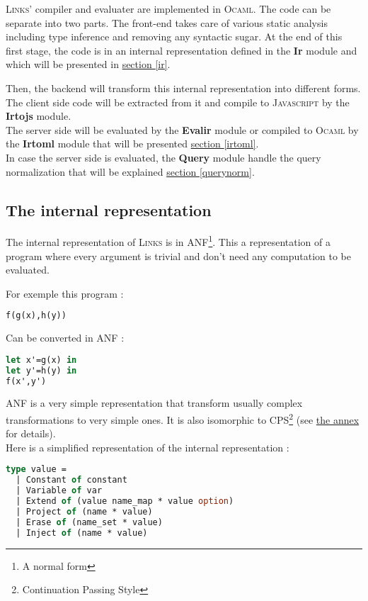 \documentclass[11pt]{article}
\newcommand\mysc[1]{{\rmfamily\textsc{#1}}\xspace}
\newcommand\links{\mysc{Links}}
\newcommand\js{\mysc{Javascript}}
\newcommand\ocaml{\mysc{Ocaml}}
\newcommand\refsec[1]{\hyperref[#1]{section \ref*{#1}}}
\newcommand\module[1]{{\bf #1}}
\begin{document}
\links' compiler and evaluater are implemented in \ocaml. 
The code can be separate into two parts. 
The front-end takes care of various static analysis including type inference and removing any syntactic sugar. 
At the end of this first stage, the code is in an internal representation defined in the \module{Ir} module and which will be presented in \refsec{ir}. 

Then, the backend will transform this internal representation into different forms.\\
The client side code will be extracted from it and compile to \js by the \module{Irtojs} module.\\
The server side will be evaluated by the \module{Evalir} module or compiled to \ocaml by the \module{Irtoml} module that will be presented \refsec{irtoml}.\\
In case the server side is evaluated, the \module{Query} module handle the query normalization that will be explained \refsec{querynorm}.

\subsection{The internal representation \label{ir}}

The internal representation of \links is in ANF\footnote{A normal form}. This a representation of a program where every argument is trivial and don't need any computation to be evaluated. 

For exemple this program :
\begin{lstlisting}[language=ML]
f(g(x),h(y))
\end{lstlisting}
Can be converted in ANF :
\begin{lstlisting}[language=ML]
let x'=g(x) in
let y'=h(y) in
f(x',y')
\end{lstlisting}

ANF is a very simple representation that transform usually complex transformations to very simple ones. It is also isomorphic to CPS\footnote{Continuation Passing Style} (see \hyperref[cps]{the annex} for details).\\

Here is a simplified representation of the internal representation :
\begin{lstlisting}[language=ML]
type value =
  | Constant of constant
  | Variable of var
  | Extend of (value name_map * value option)
  | Project of (name * value)
  | Erase of (name_set * value)
  | Inject of (name * value)
\end{lstlisting}
\end{document}
